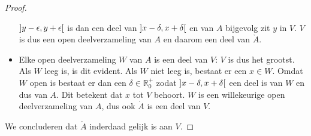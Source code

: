 \documentclass[main.tex]{subfiles}
\begin{document}
\begin{bpr}
\begin{proof}
\begin{itemize}
\begin{figure}[H]
      \end{figure}
      $\interval[open]{y-\epsilon}{y+\epsilon}$ is dan een deel van $\interval[open]{x-\delta}{x+\delta}$ en van $A$ bijgevolg zit $y$ in $V$.
      $V$ is dus een open deelverzameling van $A$ en daarom een deel van $\mathring{A}$.
    \item Elke open deelverzameling $W$ van $A$ is een deel van $V$: $V$ is dus het grootst.\\
      Als $W$ leeg is, is dit evident.
      Als $W$ niet leeg is, bestaat er een $x\in W$.
      Omdat $W$ open is bestaat er dan een $\delta\in \mathbb{R}_{0}^{+}$ zodat $\interval[open]{x-\delta}{x+\delta}$ een deel is van $W$ en dus van $A$.
      Dit betekent dat $x$ tot $V$ behoort.
      $W$ is een willekeurige open deelverzameling van $A$, dus ook $\mathring{A}$ is een deel van $V$.
    \end{itemize}
    We concluderen dat $\mathring{A}$ inderdaad gelijk is aan $V$.
  \end{proof}
\end{bpr}
\end{document}

